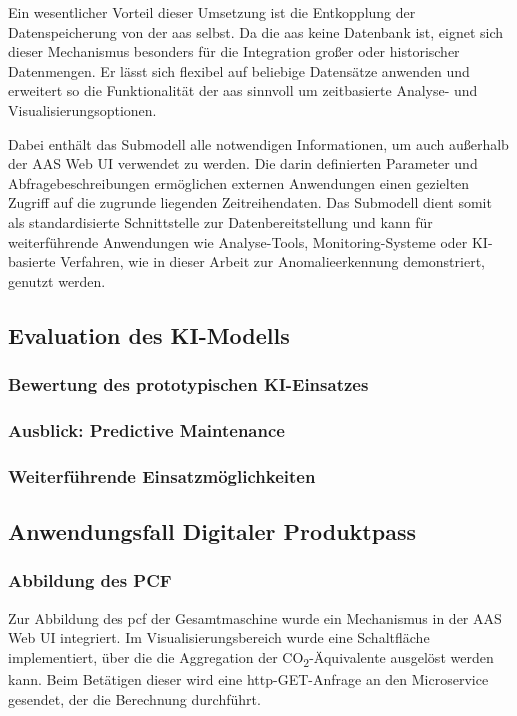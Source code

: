 Ein wesentlicher Vorteil dieser Umsetzung ist die Entkopplung der Datenspeicherung von der \acs{aas} selbst. 
Da die \acs{aas} keine Datenbank ist, eignet sich dieser Mechanismus besonders für die Integration großer oder historischer Datenmengen. 
Er lässt sich flexibel auf beliebige Datensätze anwenden und erweitert so die Funktionalität der \acs{aas} sinnvoll um zeitbasierte Analyse- und Visualisierungsoptionen.

Dabei enthält das Submodell alle notwendigen Informationen, um auch außerhalb der AAS Web UI verwendet zu werden.
Die darin definierten Parameter und Abfragebeschreibungen ermöglichen externen Anwendungen einen gezielten Zugriff auf die zugrunde liegenden Zeitreihendaten.
Das Submodell dient somit als standardisierte Schnittstelle zur Datenbereitstellung und kann für weiterführende Anwendungen wie Analyse-Tools, Monitoring-Systeme oder KI-basierte Verfahren, wie in dieser Arbeit zur Anomalieerkennung demonstriert, genutzt werden.

\subsection{Evaluation des KI-Modells}
\subsubsection{Bewertung des prototypischen KI-Einsatzes}
\subsubsection{Ausblick: Predictive Maintenance}
\subsubsection{Weiterführende Einsatzmöglichkeiten}

\newpage
\subsection{Anwendungsfall Digitaler Produktpass}
\subsubsection{Abbildung des PCF}
Zur Abbildung des \acs{pcf} der Gesamtmaschine wurde ein Mechanismus in der AAS Web UI integriert. 
Im Visualisierungsbereich wurde eine Schaltfläche implementiert, über die die Aggregation der CO\textsubscript{2}-Äquivalente ausgelöst werden kann. 
Beim Betätigen dieser wird eine \acs{http}-GET-Anfrage an den Microservice gesendet, der die Berechnung durchführt.

